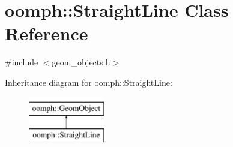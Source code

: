 \hypertarget{classoomph_1_1StraightLine}{}\section{oomph\+:\+:Straight\+Line Class Reference}
\label{classoomph_1_1StraightLine}


{\ttfamily \#include $<$geom\+\_\+objects.\+h$>$}

Inheritance diagram for oomph\+:\+:Straight\+Line\+:\begin{figure}[H]
\begin{center}
\leavevmode
\includegraphics[height=2.000000cm]{classoomph_1_1StraightLine}
\end{center}
\end{figure}
